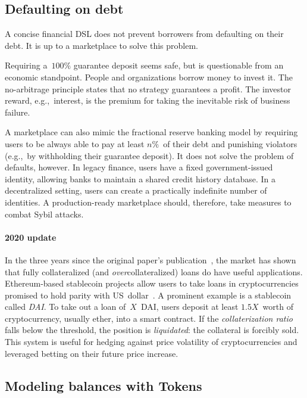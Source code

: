 \subsection{Defaulting on debt}

A concise financial DSL does not prevent borrowers from defaulting on their debt.
It is up to a marketplace to solve this problem.

Requiring a~$100\%$ guarantee deposit seems safe, but is questionable from an economic standpoint.
People and organizations borrow money to invest it.
The no-arbitrage principle states that no strategy guarantees a profit.
The investor reward, e.g.,~interest, is the premium for taking the inevitable risk of business failure.

A marketplace can also mimic the fractional reserve banking model by requiring users to be always able to pay at least $n\%$~of their debt and punishing violators (e.g.,~by withholding their guarantee deposit).
It does not solve the problem of defaults, however.
In legacy finance, users have a fixed government-issued identity, allowing banks to maintain a shared credit history database.
In a decentralized setting, users can create a practically indefinite number of identities.
A production-ready marketplace should, therefore, take measures to combat Sybil attacks.

\paragraph{2020 update}
In the three years since the original paper's publication~\cite{Biryukov2017}, the market has shown that fully collateralized (and \textit{over}collateralized) loans do have useful applications.
Ethereum-based stablecoin projects allow users to take loans in cryptocurrencies promised to hold parity with US~dollar~\cite{Mita2019}.
A prominent example is a stablecoin called \textit{DAI}.
To take out a loan of~$X$~DAI, users deposit at least $1.5X$~worth of cryptocurrency, usually ether, into a smart contract.
If the \textit{collaterization ratio} falls below the threshold, the position is \textit{liquidated}: the collateral is forcibly sold.
This system is useful for hedging against price volatility of cryptocurrencies and leveraged betting on their future price increase.


\subsection{Modeling balances with Tokens}

